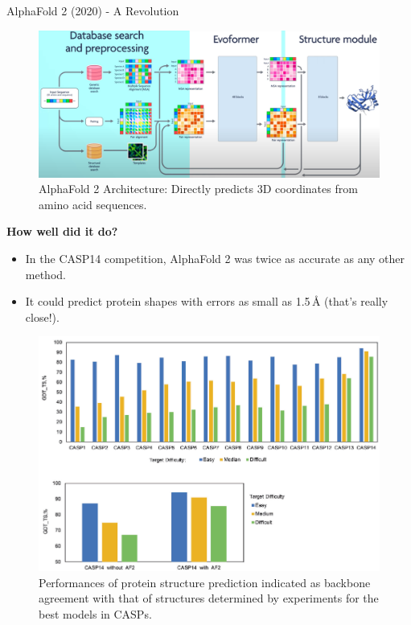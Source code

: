 \begin{frame}[allowframebreaks]{AlphaFold 2 (2020) - A Revolution}
    \framebreak

    \begin{figure}
        \centering
        \includegraphics[width=\linewidth,height=0.85\textheight,keepaspectratio]{images/science/alphafold-2-architecture-2.png}
        \caption*{AlphaFold 2 Architecture: Directly predicts 3D coordinates from amino acid sequences.}
    \end{figure}

    \framebreak

    \textbf{How well did it do?}
    \begin{itemize}
        \item In the CASP14 competition, AlphaFold 2 was twice as accurate as any other method.
        \item It could predict protein shapes with errors as small as 1.5 Å (that’s really close!).
    \end{itemize}

    \framebreak

    \begin{figure}
        \centering
        \includegraphics[width=\linewidth,height=0.8\textheight,keepaspectratio]{images/science/alphafold-2-result.png}
        \caption*{Performances of protein structure prediction indicated as backbone agreement with that of structures determined by experiments for
the best models in CASPs.}
    \end{figure}


\end{frame}
